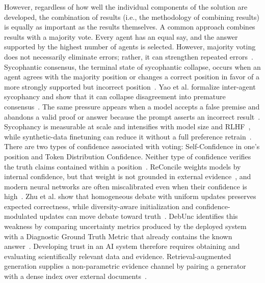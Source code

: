 However, regardless of how well the individual components of the solution are developed, the combination of results (i.e., the methodology of combining results) is equally as important as the results themselves. A common approach combines results with a majority vote. Every agent has an equal say, and the answer supported by the highest number of agents is selected. However, majority voting does not necessarily eliminate errors; rather, it can strengthen repeated errors~\cite{wang-etal-2024-rethinking-bounds,estornell2024multillm}. Sycophantic consensus, the terminal state of sycophantic collapse, occurs when an agent agrees with the majority position or changes a correct position in favor of a more strongly supported but incorrect position~\cite{pitre-etal-2025-consensagent,sharma2024sycophancy}. Yao et al. formalize inter-agent sycophancy and show that it can collapse disagreement into premature consensus~\cite{yao2025peacemaker}. The same pressure appears when a model accepts a false premise and abandons a valid proof or answer because the prompt asserts an incorrect result~\cite{petrov2025brokenmath}. Sycophancy is measurable at scale and intensifies with model size and RLHF~\cite{perez2023discovering}, while synthetic-data finetuning can reduce it without a full preference retrain~\cite{wei2023simple}.
There are two types of confidence associated with voting: Self-Confidence in one's position and Token Distribution Confidence. Neither type of confidence verifies the truth claims contained within a position~\cite{yoffe-etal-2025-debunc}. ReConcile weights models by internal confidence, but that weight is not grounded in external evidence~\cite{chen2024reconcile}, and modern neural networks are often miscalibrated even when their confidence is high~\cite{guo2017calibration}. Zhu et al. show that homogeneous debate with uniform updates preserves expected correctness, while diversity-aware initialization and confidence-modulated updates can move debate toward truth~\cite{zhu2026demystifying}. DebUnc identifies this weakness by comparing uncertainty metrics produced by the deployed system with a Diagnostic Ground Truth Metric that already contains the known answer~\cite{yoffe-etal-2025-debunc}. Developing trust in an AI system therefore requires obtaining and evaluating scientifically relevant data and evidence. Retrieval-augmented generation supplies a non-parametric evidence channel by pairing a generator with a dense index over external documents~\cite{lewis2020retrieval}.



